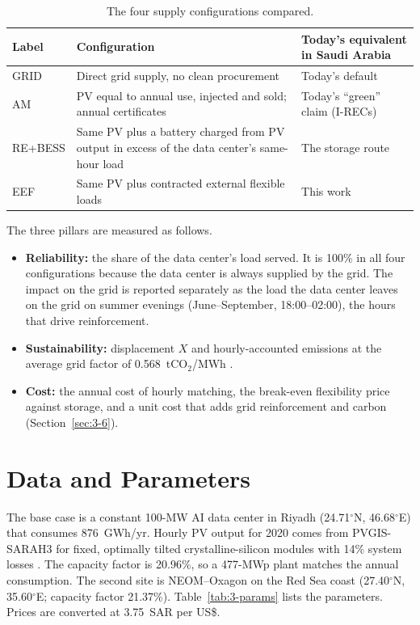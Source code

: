 \begin{table}[!htbp]
\centering
\caption{The four supply configurations compared.}
\label{tab:3-configs}
\small
\renewcommand{\arraystretch}{1.2}
\begin{tabularx}{\textwidth}{>{\raggedright\arraybackslash}p{2.2cm}>{\raggedright\arraybackslash}X>{\raggedright\arraybackslash}p{4.4cm}}
\toprule
\textbf{Label} & \textbf{Configuration} & \textbf{Today's equivalent in Saudi Arabia} \\
\midrule
GRID & Direct grid supply, no clean procurement & Today's default \\
AM & PV equal to annual use, injected and sold; annual certificates & Today's ``green'' claim (I-RECs) \\
RE+BESS & Same PV plus a battery charged from PV output in excess of the data center's same-hour load & The storage route \\
EEF & Same PV plus contracted external flexible loads & This work \\
\bottomrule
\end{tabularx}
\end{table}

The three pillars are measured as follows.
\begin{itemize}
\item \textbf{Reliability:} the share of the data center's load served. It is 100\% in all four configurations because the data center is always supplied by the grid. The impact on the grid is reported separately as the load the data center leaves on the grid on summer evenings (June--September, 18:00--02:00), the hours that drive reinforcement.
\item \textbf{Sustainability:} displacement $X$ and hourly-accounted emissions at the average grid factor of 0.568~tCO$_2$/MWh \cite{kfupmghg}.
\item \textbf{Cost:} the annual cost of hourly matching, the break-even flexibility price against storage, and a unit cost that adds grid reinforcement and carbon (Section~\ref{sec:3-6}).
\end{itemize}

\section{Data and Parameters}\label{sec:3-4}

The base case is a constant 100-MW AI data center in Riyadh (24.71$^\circ$N, 46.68$^\circ$E) that consumes 876~GWh/yr. Hourly PV output for 2020 comes from PVGIS-SARAH3 for fixed, optimally tilted crystalline-silicon modules with 14\% system losses \cite{pvgis}. The capacity factor is 20.96\%, so a 477-MWp plant matches the annual consumption. The second site is NEOM--Oxagon on the Red Sea coast (27.40$^\circ$N, 35.60$^\circ$E; capacity factor 21.37\%). Table~\ref{tab:3-params} lists the parameters. Prices are converted at 3.75~SAR per US\$.

